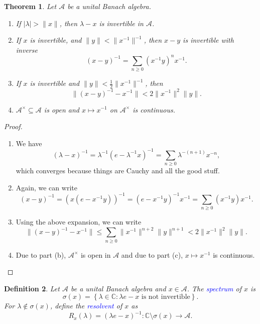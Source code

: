\documentclass[12pt]{article}
\theoremstyle{thmstyle}
\newtheorem{theorem}{Theorem}[section]
\theoremstyle{defstyle}
\newtheorem{definition}[theorem]{Definition}
\newcommand{\bbC}{\mathbb{C}}
\newcommand{\calA}{\mathcal{A}} %
\newcommand{\define}[1]{\textcolor{blue}{\textit{#1}}}
\renewcommand{\le}{\leqslant}
\renewcommand{\ge}{\geqslant}
\begin{document}
\begin{theorem}
    Let $\calA$ be a unital Banach algebra. 
    \begin{enumerate}[label=(\alph*)]
        \item If $|\lambda| > \|x\|$, then $\lambda - x$ is invertible in $\calA$.
        \item If $x$ is invertible, and $\|y\| < \|x^{-1}\|^{-1}$, then $x - y$ is invertible with inverse 
        \begin{equation*}
            (x - y)^{-1} = \sum_{n\ge 0}(x^{-1}y)^nx^{-1}.
        \end{equation*}
        \item If $x$ is invertible and $\|y\| < \frac{1}{2}\|x^{-1}\|^{-1}$, then 
        \begin{equation*}
            \|(x - y)^{-1} - x^{-1}\| < 2\|x^{-1}\|^2\|y\|.
        \end{equation*}
        \item $\calA^\times\subseteq\calA$ is open and $x\mapsto x^{-1}$ on $\calA^\times$ is continuous.
    \end{enumerate}
\end{theorem}
\begin{proof}
\begin{enumerate}[label=(\alph*)]
\item We have 
\begin{equation*}
    (\lambda - x)^{-1} = \lambda^{-1}\left(e - \lambda^{-1}x\right)^{-1} = \sum_{n\ge 0}\lambda^{-(n + 1)}x^{-n},
\end{equation*}
which converges because things are Cauchy and all the good stuff.
\item Again, we can write 
\begin{equation*}
    (x - y)^{-1} = \left(x(e - x^{-1}y)\right)^{-1} = (e - x^{-1}y)^{-1}x^{-1} = \sum_{n\ge 0}(x^{-1}y)x^{-1}.
\end{equation*}
\item Using the above expansion, we can write 
\begin{equation*}
    \|(x - y)^{-1} - x^{-1}\|\le\sum_{n\ge 0}\|x^{-1}\|^{n + 2}\|y\|^{n + 1} < 2\|x^{-1}\|^2\|y\|.
\end{equation*}
\item Due to part (b), $\calA^\times$ is open in $\calA$ and due to part (c), $x\mapsto x^{-1}$ is continuous.
\end{enumerate}
\end{proof}

\begin{definition}
    Let $\calA$ be a unital Banach algebra and $x\in\calA$. The \define{spectrum} of $x$ is 
    \begin{equation*}
        \sigma(x) = \left\{\lambda\in\bbC\colon \lambda e - x \text{ is not invertible}\right\}.
    \end{equation*}
    For $\lambda\notin\sigma(x)$, define the \define{resolvent} of $x$ as 
    \begin{equation*}
        R_x(\lambda) = (\lambda e - x)^{-1}: \bbC\setminus\sigma(x)\to\calA.
    \end{equation*}
\end{definition}
\end{document}
